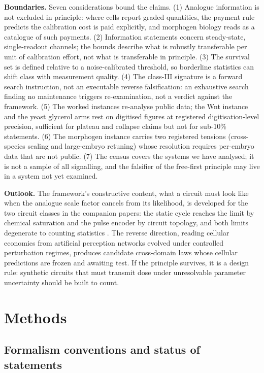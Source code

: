 \documentclass[11pt,a4paper]{article}
\begin{document}
\textbf{Boundaries.} Seven considerations bound the claims. (1) Analogue information is not excluded in principle: where cells report graded quantities, the payment rule predicts the calibration cost is paid explicitly, and morphogen biology reads as a catalogue of such payments. (2) Information statements concern steady-state, single-readout channels; the bounds describe what is robustly transferable per unit of calibration effort, not what is transferable in principle. (3) The survival set is defined relative to a noise-calibrated threshold, so borderline statistics can shift class with measurement quality. (4) The class-III signature is a forward search instruction, not an executable reverse falsification: an exhaustive search finding no maintenance triggers re-examination, not a verdict against the framework. (5) The worked instances re-analyse public data; the Wnt instance and the yeast glycerol arms rest on digitised figures at registered digitisation-level precision, sufficient for plateau and collapse claims but not for sub-10\% statements. (6) The morphogen instance carries two registered tensions (cross-species scaling and large-embryo retuning) whose resolution requires per-embryo data that are not public. (7) The census covers the systems we have analysed; it is not a sample of all signalling, and the falsifier of the free-first principle may live in a system not yet examined.

\textbf{Outlook.} The framework's constructive content, what a circuit must look like when the analogue scale factor cancels from its likelihood, is developed for the two circuit classes in the companion papers: the static cycle reaches the limit by chemical saturation and the pulse encoder by circuit topology, and both limits degenerate to counting statistics \cite{CompanionP53}. The reverse direction, reading cellular economics from artificial perception networks evolved under controlled perturbation regimes, produces candidate cross-domain laws whose cellular predictions are frozen and awaiting test. If the principle survives, it is a design rule: synthetic circuits that must transmit dose under unresolvable parameter uncertainty should be built to count.

\section{Methods}

\subsection{Formalism conventions and status of statements}
\end{document}
